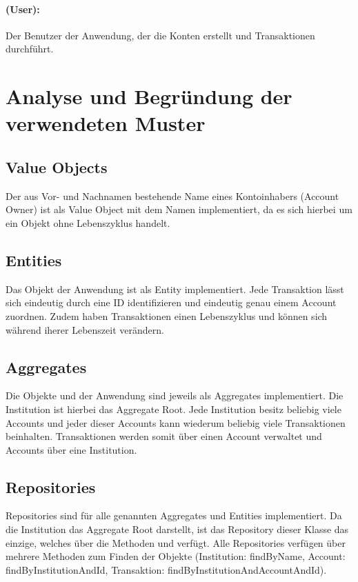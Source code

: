 \paragraph*{ (User):} Der Benutzer der Anwendung, der die Konten erstellt und Transaktionen durchführt.



\section{Analyse und Begründung der verwendeten Muster}
\subsection*{Value Objects}
Der aus Vor- und Nachnamen bestehende Name eines Kontoinhabers (Account Owner) ist als Value Object mit dem Namen  implementiert, da es sich hierbei um ein Objekt ohne Lebenszyklus handelt.
\subsection*{Entities}
Das Objekt  der Anwendung ist als Entity implementiert. Jede Transaktion lässt sich eindeutig durch eine ID identifizieren und eindeutig genau einem Account zuordnen. Zudem haben Transaktionen einen Lebenszyklus und können sich während iherer Lebenszeit verändern.
\subsection*{Aggregates}
Die Objekte  und  der Anwendung sind jeweils als Aggregates implementiert. Die Institution ist hierbei das Aggregate Root. Jede Institution besitz beliebig viele Accounts und jeder dieser Accounts kann wiederum beliebig viele Transaktionen beinhalten. Transaktionen werden somit über einen Account verwaltet und Accounts über eine Institution.
\subsection*{Repositories}
Repositories sind für alle genannten Aggregates und Entities implementiert. Da die Institution das Aggregate Root darstellt, ist das Repository dieser Klasse das einzige, welches über die Methoden  und  verfügt. Alle Repositories verfügen über mehrere Methoden zum Finden der Objekte (Institution: findByName, Account: findByInstitutionAndId, Transaktion: findByInstitutionAndAccountAndId). 
